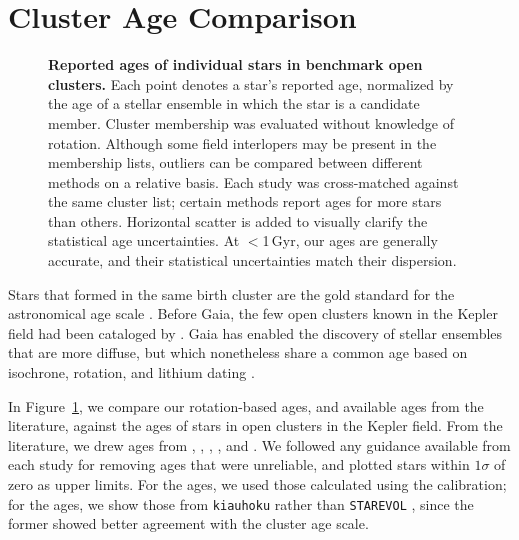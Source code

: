 \documentclass[11pt,twocolumn,tighten,linenumbers]{aastex63}
\begin{document}
\section{Cluster Age Comparison}
\label{sec:litagecomparison}


\begin{figure}[!t]
	\begin{center}
	\end{center}
	\vspace{-0.5cm}
	\caption{
		{\bf Reported ages of individual stars in benchmark open clusters.}
    Each point denotes a star's reported age, normalized by the age of
    a stellar ensemble in which the star is a candidate member.
    Cluster membership was evaluated without knowledge of rotation.
    Although some field interlopers may be present in the membership
    lists, outliers can be compared between different methods on a
    relative basis.  Each study was cross-matched against the same
    cluster list; certain methods report ages for more stars than
    others.  Horizontal scatter is added to visually clarify the
    statistical age uncertainties.  At $<$1\,Gyr, our ages are
    generally accurate, and their statistical uncertainties match
    their dispersion.
	}
	\label{fig:agescalecompone}
\end{figure}

Stars that formed in the same birth cluster are the gold standard for
the astronomical age scale \citep{Soderblom_2010}.  Before Gaia, the
few open clusters known in the Kepler field had been cataloged by
\citet{1864RSPT..154....1H}.  Gaia has enabled the discovery of
stellar ensembles that are more diffuse, but which nonetheless share a
common age based on isochrone, rotation, and lithium dating
\cite[e.g.][]{2019AJ....158..122K,Bouma_2022b,Barber_2022}.

In Figure~\ref{fig:agescalecompone}, we compare our rotation-based
ages, and available ages from the literature, against the ages of
stars in open clusters in the Kepler field.  From the literature, we
drew ages from \citet{Reinhold_2015}, \citet{Berger_2020a_catalog},
\citet{2021AJ....161..189L}, \citet{2023ApJ...952..131M}, and
\citet{2024AJ....167..159L}.  We followed any guidance available from
each study for removing ages that were unreliable, and plotted stars
within $1\sigma$ of zero as upper limits.  For the
\citeauthor{Reinhold_2015} ages, we used those calculated using the
\citet{Mamajek_2008} calibration; for the
\citeauthor{2023ApJ...952..131M} ages, we show those from
\texttt{kiauhoku} \citep{Claytor2020} rather than \texttt{STAREVOL}
\citep{Amard2019}, since the former showed better agreement with the
cluster age scale.
\end{document}
